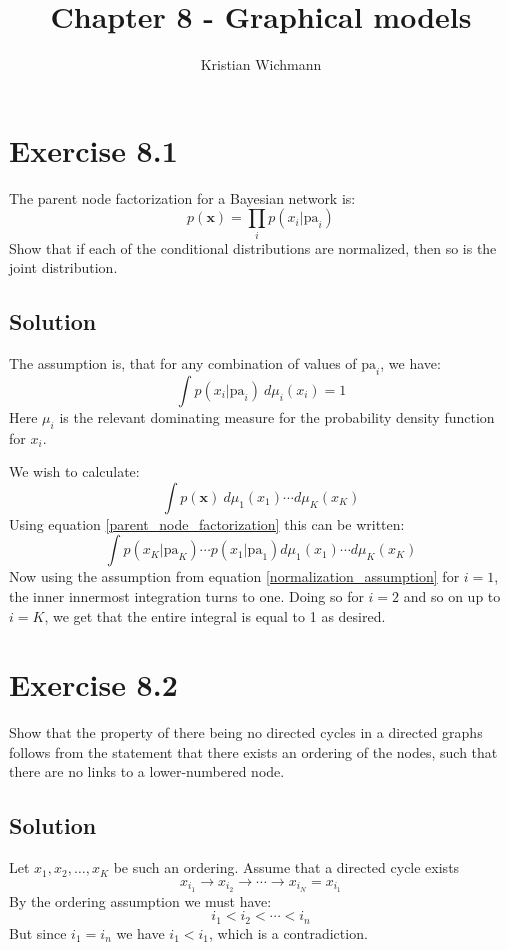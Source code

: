 \documentclass[12pt, a4paper]{article}
\title{Chapter 8 - Graphical models}
\author{Kristian Wichmann}
\numberwithin{equation}{section}
\begin{document}
\maketitle

\section{Exercise 8.1}
The parent node factorization for a Bayesian network is:
\begin{equation}
p(\mathbf{x})=\prod_i p(x_i|\textrm{pa}_i)
\label{parent_node_factorization}
\end{equation}
Show that if each of the conditional distributions are normalized, then so is the joint distribution.

\subsection{Solution}
The assumption is, that for any combination of values of $\textrm{pa}_i$, we have:
\begin{equation}
\int p(x_i|\textrm{pa}_i)\ d\mu_i(x_i)=1
\label{normalization_assumption}
\end{equation}
Here $\mu_i$ is the relevant dominating measure for the probability density function for $x_i$.

We wish to calculate:
\begin{equation}
\int p(\mathbf{x})\ d\mu_1(x_1)\cdots d\mu_K(x_K)
\end{equation}
Using equation \ref{parent_node_factorization} this can be written:
\begin{equation}
\int p(x_K|\textrm{pa}_K)\cdots p(x_1|\textrm{pa}_1) d\mu_1(x_1)\cdots d\mu_K(x_K)
\end{equation}
Now using the assumption from equation \ref{normalization_assumption} for $i=1$, the inner innermost integration turns to one. Doing so for $i=2$ and so on up to $i=K$, we get that the entire integral is equal to 1 as desired.

\section{Exercise 8.2}
Show that the property of there being no directed cycles in a directed graphs follows from the statement that there exists an ordering of the nodes, such that there are no links to a lower-numbered node.

\subsection{Solution}
Let $x_1, x_2,\dots, x_K$ be such an ordering. Assume that a directed cycle exists
\begin{equation}
x_{i_1}\rightarrow x_{i_2}\rightarrow\cdots\rightarrow x_{i_N}=x_{i_1}
\end{equation}
By the ordering assumption we must have:
\begin{equation}
i_1<i_2<\cdots<i_n
\end{equation}
But since $i_1=i_n$ we have $i_1<i_1$, which is a contradiction.
\end{document}

